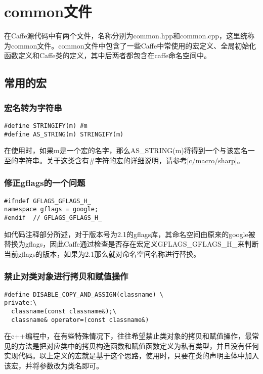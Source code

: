\chapter{common文件}
在Caffe源代码中有两个文件，名称分别为common.hpp和common.cpp，这里统称为common文件。common文件中包含了一些Caffe中常使用的宏定义、全局初始化函数定义和Caffe类的定义，其中后两者都包含在caffe命名空间中。
\section{常用的宏}
\subsection{宏名转为字符串}
\begin{verbatim}
#define STRINGIFY(m) #m
#define AS_STRING(m) STRINGIFY(m)
\end{verbatim}
在使用时，如果m是一个宏的名字，那么AS\_STRING(m)将得到一个与该宏名一至的字符串。关于这类含有\#字符的宏的详细说明，请参考\ref{c/macro/sharp}。
\subsection{修正gflags的一个问题}
\begin{verbatim}
#ifndef GFLAGS_GFLAGS_H_
namespace gflags = google;
#endif  // GFLAGS_GFLAGS_H_
\end{verbatim}
如代码注释部分所述，对于版本号为2.1的gflags库，其命名空间由原来的google被替换为gflags，因此Caffe通过检查是否存在宏定义GFLAGS\_GFLAGS\_H\_来判断当前gflags的版本，如果为2.1那么就对命名空间名称进行替换。
\subsection{禁止对类对象进行拷贝和赋值操作}\label{common/macro/discpy}
\begin{verbatim}
#define DISABLE_COPY_AND_ASSIGN(classname) \
private:\
  classname(const classname&);\
  classname& operator=(const classname&)
\end{verbatim}
在c++编程中，在有些特殊情况下，往往希望禁止类对象的拷贝和赋值操作，最常见的方法是把对应类中的拷贝构造函数和赋值函数定义为私有类型，并且没有任何实现代码。以上定义的宏就是基于这个思路，使用时，只要在类的声明主体中加入该宏，并将参数改为类名即可。
